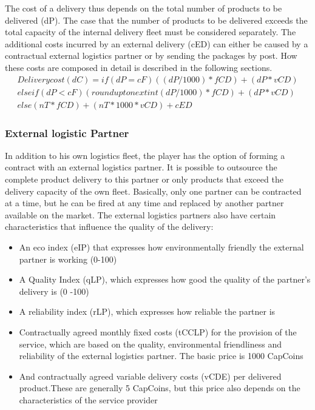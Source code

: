 The cost of a delivery thus depends on the total number of products to be delivered (dP). 
The case that the number of products to be delivered exceeds the total capacity of the internal delivery fleet must be considered separately. The additional costs incurred by an external delivery (cED) can either be caused by a contractual external logistics partner or by sending the packages by post. How these costs are composed in detail is described in the following sections. 
\begin{equation}
\begin{aligned}
Delivery cost (dC) = if ( dP = cF ) { (( dP / 1000) * fCD) + ( dP * vCD) } \\
elseif ( dP < cF ) { (round up to next int ( dP / 1000) * fCD ) + ( dP * vCD) } \\
else { ( nT * fCD ) + ( nT *1000 * vCD ) + cED }
\end{aligned}
\end{equation}

\subsubsection{External logistic Partner}
In addition to his own logistics fleet, the player has the option of forming a contract with an external logistics partner. It is possible to outsource the complete product delivery to this partner or only products that exceed the delivery capacity of the own fleet. Basically, only one partner can be contracted at a time, but he can be fired at any time and replaced by another partner available on the market. 
The external logistics partners also have certain characteristics that influence the quality of the delivery: 

\begin{itemize}
    \item An eco index (eIP) that expresses how environmentally friendly the external partner is working (0-100)
    \item A Quality Index (qLP), which expresses how good the quality of the partner's delivery is (0 -100)
    \item A reliability index (rLP), which expresses how reliable the partner is
    \item Contractually agreed monthly fixed costs (tCCLP) for the provision of the service, which are based on the quality, environmental friendliness and reliability of the external logistics partner. The basic price is 1000 CapCoins 
    \item And contractually agreed variable delivery costs (vCDE) per delivered product.These are generally 5 CapCoins, but this price also depends on the characteristics of the service provider
\end{itemize}


